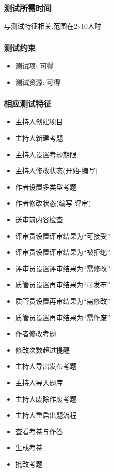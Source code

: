 \documentclass[hyperref, a4paper]{ctexart}
\providecommand{\tightlist}{%
  \setlength{\itemsep}{0pt}\setlength{\parskip}{0pt}}
\begin{document}
\hypertarget{ux6d4bux8bd5ux6240ux9700ux65f6ux95f4}{%
\subsubsection{测试所需时间}\label{ux6d4bux8bd5ux6240ux9700ux65f6ux95f4}}

与测试特征相关,范围在2\textasciitilde10人时

\hypertarget{ux6d4bux8bd5ux7ea6ux675f}{%
\subsubsection{测试约束}\label{ux6d4bux8bd5ux7ea6ux675f}}

\begin{itemize}
\tightlist
\item
  测试项: 可得
\item
  测试资源: 可得
\end{itemize}

\hypertarget{ux76f8ux5e94ux6d4bux8bd5ux7279ux5f81}{%
\subsubsection{相应测试特征}\label{ux76f8ux5e94ux6d4bux8bd5ux7279ux5f81}}

\begin{itemize}
\tightlist
\item
  主持人创建项目
\item
  主持人新建考题
\item
  主持人设置考题期限
\item
  主持人修改状态(开始-编写)
\item
  作者设置多类型考题
\item
  作者修改状态(编写-评审)
\item
  送审前内容检查
\item
  评审员设置评审结果为``可接受''
\item
  评审员设置评审结果为``被拒绝''
\item
  评审员设置评审结果为``需修改''
\item
  质管员设置再审结果为``可发布''
\item
  质管员设置再审结果为``需修改''
\item
  质管员设置再审结果为``需作废''
\item
  作者修改考题
\item
  修改次数超过提醒
\item
  主持人导出发布考题
\item
  主持人导入题库
\item
  主持人废除作废考题
\item
  主持人重启出题流程
\item
  查看考卷与作答
\item
  生成考卷
\item
  批改考题
\end{itemize}
\end{document}

